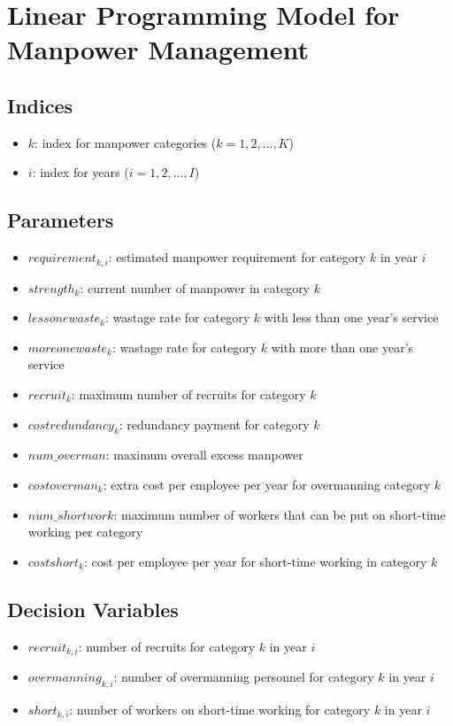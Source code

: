 \documentclass{article}
\begin{document}
\section*{Linear Programming Model for Manpower Management}

\subsection*{Indices}
\begin{itemize}
    \item $k$: index for manpower categories ($k = 1, 2, \ldots, K$)
    \item $i$: index for years ($i = 1, 2, \ldots, I$)
\end{itemize}

\subsection*{Parameters}
\begin{itemize}
    \item $requirement_{k,i}$: estimated manpower requirement for category $k$ in year $i$
    \item $strength_{k}$: current number of manpower in category $k$
    \item $lessonewaste_{k}$: wastage rate for category $k$ with less than one year's service
    \item $moreonewaste_{k}$: wastage rate for category $k$ with more than one year's service
    \item $recruit_{k}$: maximum number of recruits for category $k$
    \item $costredundancy_{k}$: redundancy payment for category $k$
    \item $num\_overman$: maximum overall excess manpower
    \item $costoverman_{k}$: extra cost per employee per year for overmanning category $k$
    \item $num\_shortwork$: maximum number of workers that can be put on short-time working per category
    \item $costshort_{k}$: cost per employee per year for short-time working in category $k$
\end{itemize}

\subsection*{Decision Variables}
\begin{itemize}
    \item $recruit_{k,i}$: number of recruits for category $k$ in year $i$
    \item $overmanning_{k,i}$: number of overmanning personnel for category $k$ in year $i$
    \item $short_{k,i}$: number of workers on short-time working for category $k$ in year $i$
\end{itemize}
\end{document}
